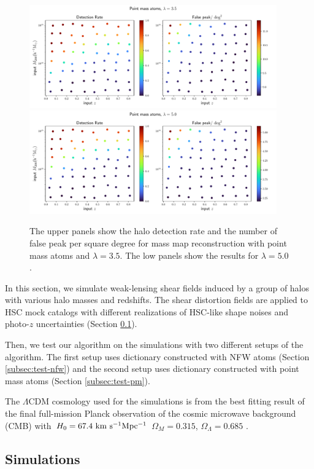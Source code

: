 \documentclass[twocolumn]{aastex62}
\begin{document}
\begin{figure}[!ht]
 \centering
 \includegraphics[width=0.95\textwidth]{detfalseRate_f1-1.pdf}
 \includegraphics[width=0.95\textwidth]{detfalseRate_f1-3.pdf}
 \caption{The upper panels show the halo detection rate and the number of false peak per square degree for mass map 
 reconstruction with point mass atoms and $\lambda=3.5$. The low panels show the results for $\lambda=5.0$. }
\end{figure}

In this section, we simulate weak-lensing shear fields induced by a group of halos with various halo masses
and redshifts. The shear distortion fields are applied to HSC mock catalogs with different realizations of HSC-like shape
noises and photo-$z$ uncertainties (Section \ref{subsec:Sims}).

Then, we test our algorithm on the simulations with two different setups of the algorithm. The first setup uses dictionary
constructed with NFW atoms (Section \ref{subsec:test-nfw}) and the second setup uses dictionary constructed with point mass
atoms (Section \ref{subsec:test-pm}).

The $\Lambda$CDM cosmology used for the simulations is from the best fitting result of the final full-mission Planck observation
of the cosmic microwave background (CMB) with $H_0=67.4 ~\rm{km~s^{-1} Mpc^{-1}}$ $\Omega_M=0.315$, $\Omega_\Lambda=0.685$
\citep{cmb-Planck2018-Cosmology}.

\subsection{Simulations}
\label{subsec:Sims}
\end{document}
